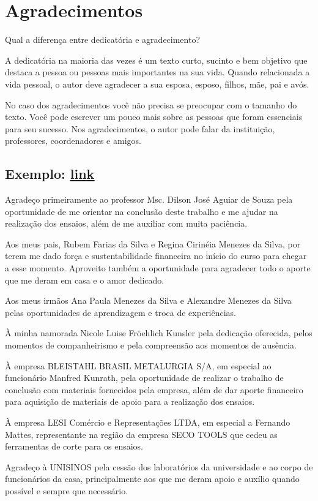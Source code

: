 \chapter*{Agradecimentos}
Qual a diferença entre dedicatória e agradecimento? 

A dedicatória na maioria das vezes é um texto curto, sucinto e bem objetivo que destaca a pessoa ou pessoas mais importantes na sua vida. Quando relacionada a vida pessoal, o autor deve agradecer a sua esposa, esposo, filhos, mãe, pai e avós.

No caso dos agradecimentos você não precisa se preocupar com o tamanho do texto. Você pode escrever um pouco mais sobre as pessoas que foram essenciais para seu sucesso. Nos agradecimentos, o autor pode falar da instituição, professores, coordenadores e amigos.

\section*{Exemplo: \href{https://www.abcm.org.br/downloads/TCC_-_Engenharia_Mecanica_2011-1_-_Adriano_Menezes_da_Silva.pdf}{\underline{link}}}

Agradeço primeiramente ao professor Msc. Dilson José Aguiar de Souza pela oportunidade de me orientar na conclusão deste trabalho e me ajudar na realização dos ensaios, além de me auxiliar com muita paciência.

Aos meus pais, Rubem Farias da Silva e Regina Cirinéia Menezes da Silva, por terem me dado força e sustentabilidade financeira no início do curso para chegar a esse momento. Aproveito também a oportunidade para agradecer todo o aporte que me deram em casa e o amor dedicado.

Aos meus irmãos Ana Paula Menezes da Silva e Alexandre Menezes da Silva pelas oportunidades de aprendizagem e troca de experiências.

À minha namorada Nicole Luise Fröehlich Kunsler pela dedicação oferecida, pelos momentos de companheirismo e pela compreensão aos momentos de ausência.

À empresa BLEISTAHL BRASIL METALURGIA S/A, em especial ao funcionário Manfred Kunrath, pela oportunidade de realizar o trabalho de conclusão com materiais fornecidos pela empresa, além de dar aporte financeiro para aquisição de materiais de apoio para a realização dos ensaios.

À empresa LESI Comércio e Representações LTDA, em especial a Fernando Mattes, representante na região da empresa SECO TOOLS que cedeu as ferramentas de corte para os ensaios.

Agradeço à UNISINOS pela cessão dos laboratórios da universidade e ao corpo de funcionários da casa, principalmente aos que me deram apoio e auxílio quando possível e sempre que necessário.